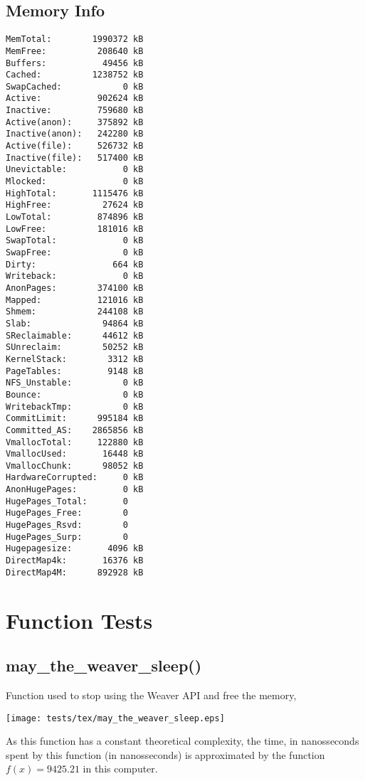 \documentclass{article}
\begin{document}
\subsection{Memory Info}
\begin{verbatim}
MemTotal:        1990372 kB
MemFree:          208640 kB
Buffers:           49456 kB
Cached:          1238752 kB
SwapCached:            0 kB
Active:           902624 kB
Inactive:         759680 kB
Active(anon):     375892 kB
Inactive(anon):   242280 kB
Active(file):     526732 kB
Inactive(file):   517400 kB
Unevictable:           0 kB
Mlocked:               0 kB
HighTotal:       1115476 kB
HighFree:          27624 kB
LowTotal:         874896 kB
LowFree:          181016 kB
SwapTotal:             0 kB
SwapFree:              0 kB
Dirty:               664 kB
Writeback:             0 kB
AnonPages:        374100 kB
Mapped:           121016 kB
Shmem:            244108 kB
Slab:              94864 kB
SReclaimable:      44612 kB
SUnreclaim:        50252 kB
KernelStack:        3312 kB
PageTables:         9148 kB
NFS_Unstable:          0 kB
Bounce:                0 kB
WritebackTmp:          0 kB
CommitLimit:      995184 kB
Committed_AS:    2865856 kB
VmallocTotal:     122880 kB
VmallocUsed:       16448 kB
VmallocChunk:      98052 kB
HardwareCorrupted:     0 kB
AnonHugePages:         0 kB
HugePages_Total:       0
HugePages_Free:        0
HugePages_Rsvd:        0
HugePages_Surp:        0
Hugepagesize:       4096 kB
DirectMap4k:       16376 kB
DirectMap4M:      892928 kB
\end{verbatim}
\section{Function Tests}
\subsection{may\_the\_weaver\_sleep()}
Function used to stop using  the Weaver API and
free the memory,

\texttt{[image: tests/tex/may\_the\_weaver\_sleep.eps]}

As this function has a constant theoretical
complexity, the time, in nanosseconds spent 
by this function (in nanosseconds) is
approximated by the function $f(x)=9425.21$
in this computer.
\end{document}
